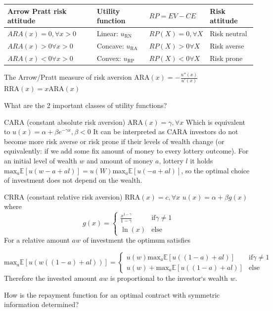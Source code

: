 \begin{tabular}{|l|l|l|l|}
\hline
Arrow Pratt risk attitude & Utility function & $ RP = EV - CE $ & Risk attitude \\ \hline
$ ARA(x) = 0, \forall x > 0 $ & Linear: $u_{\text{RN}}$ & $ RP(X) = 0, \forall X $ & Risk neutral \\ \hline
$ARA(x) > 0 \forall x > 0$ & Concave: $u_{\text{RA}}$ & $RP(X) > 0 \forall X$ & Risk averse \\ \hline
$ARA(x) < 0 \forall x > 0$ & Convex: $u_{\text{RP}}$ & $RP(X) < 0 \forall X$ & Risk prone \\ \hline
\end{tabular}

The Arrow/Pratt measure of risk aversion
\( \text{ARA}(x) = - \frac{u''(x)}{u'(x)} \)
\( \text{RRA}(x) = x\text{ARA}(x)\)


What are the 2 important classes of utility functions?


CARA (constant absolute risk aversion)
\( \text{ARA}(x) = \gamma, \forall x \)
Which is equivalent to
\( u(x) = \alpha + \beta e^{-\gamma x}, \beta < 0 \)
It can be interpreted as
CARA investors do not become more risk averse or risk prone if their levels of wealth
change (or equivalently: if we add some fix amount of money to every lottery outcome).
For an initial level of wealth \( w \) and amount of money \( a \), lottery \( l \) it holds
\( \text{max}_a \mathbb{E}[u(w - a + al)] = u(W) \text{max}_a \mathbb{E}[u(-a + al)] \),
so the optimal choice of investment does not depend on the wealth.

CRRA (constant relative risk aversion)
\( \text{RRA}(x) = c, \forall x \)
\( u(x) = \alpha + \beta g(x) \) where
\[
g(x) = \begin{cases}
\frac{x^{1-\gamma}}{1 - \gamma} & \text{if} \gamma \neq 1 \\
\ln(x) & \text{else}
\end{cases} 
\]
For a relative amount \( aw \) of investment the optimum satisfies

\[
\text{max}_a \mathbb{E}[u(w((1-a) + al))] = \begin{cases}
u(w)\text{max}_{a}\mathbb{E}[u((1-a) + al)] & \text{if} \gamma \neq 1 \\
u(w) + \text{max}_{a}\mathbb{E}[u((1-a) + al)]& \text{else}
\end{cases} 
\]
Therefore the invested amount \( aw \) is proportional to the investor‘s wealth \( w \).

How is the repayment function for an optimal contract with symmetric information
determined?

